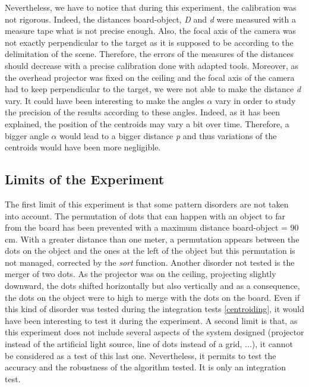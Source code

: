 Nevertheless, we have to notice that during this experiment, the calibration was not rigorous. Indeed, the distances board-object, \emph{D} and \emph{d} were measured with a measure tape what is not precise enough. Also, the focal axis of the camera was not exactly perpendicular to the target as it is supposed to be according to the delimitation of the scene. Therefore, the errors of the measures of the distances should decrease with a precise calibration done with adapted tools. Moreover, as the overhead projector was fixed on the ceiling and the focal axis of the camera had to keep perpendicular to the target, we were not able to make the distance \emph{d} vary. It could have been interesting to make the angles $\alpha$ vary in order to study the precision of the results according to these angles. Indeed, as it has been explained, the position of the centroids may vary a bit over time. Therefore, a bigger angle $\alpha$ would lead to a bigger distance \emph{p} and thus variations of the centroids would have been more negligible.





\subsection{Limits of the Experiment}
The first limit of this experiment is that some pattern disorders are not taken into account. The permutation of dots that can happen with an object to far from the board has been prevented with a maximum distance board-object = 90 cm. With a greater distance than one meter, a permutation appears between the dots on the object and the ones at the left of the object but this permutation is not managed, corrected by the \emph{sort} function. Another disorder not tested is the merger of two dots. As the projector was on the ceiling, projecting slightly downward, the dots shifted horizontally but also vertically and as a consequence, the dots on the object were to high to merge with the dots on the board. Even if this kind of disorder was tested during the integration tests \ref{centroiding}, it would have been interesting to test it during the experiment.
A second limit is that, as this experiment does not include several aspects of the system designed (projector instead of the artificial light source, line of dots instead of a grid, ...), it cannot be considered as a test of this last one. Nevertheless, it permits to test the accuracy and the robustness of the algorithm tested. It is only an integration test.





